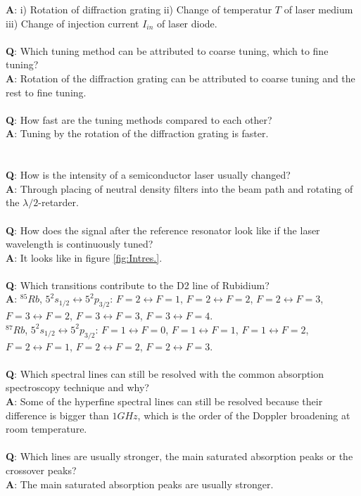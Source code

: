 \textbf{A}: i) Rotation of diffraction grating ii) Change of temperatur $T$ of laser medium iii) Change of injection current $I_{in}$ of laser diode.\\
\\
\noindent
\textbf{Q}: Which tuning method can be attributed to coarse tuning, which to fine tuning? \\
\textbf{A}: Rotation of the diffraction grating can be attributed to coarse tuning and the rest to fine tuning.\\
\\
\noindent
\textbf{Q}: How fast are the tuning methods compared to each other? \\
\textbf{A}: Tuning by the rotation of the diffraction grating is faster.\\
\\\\
\noindent
\textbf{Q}: How is the intensity of a semiconductor laser usually changed? \\
\textbf{A}: Through placing of neutral density filters into the beam path and rotating of the $\lambda/2$-retarder.\\
\\
\noindent
\textbf{Q}: How does the signal after the reference resonator look like if the laser wavelength is continuously tuned? \\
\textbf{A}: It looks like in figure \ref{fig:Intres.}.\\
\\
\noindent
\textbf{Q}: Which transitions contribute to the D2 line of Rubidium? \\
\textbf{A}: $^{85}Rb$, $5^{2}s_{1/2}\leftrightarrow5^{2}p_{3/2}$: $F=2\leftrightarrow F=1$, $F=2\leftrightarrow F=2$, $F=2\leftrightarrow F=3$, $F=3\leftrightarrow F=2$, $F=3\leftrightarrow F=3$, $F=3\leftrightarrow F=4$.\\
$^{87}Rb$, $5^{2}s_{1/2}\leftrightarrow5^{2}p_{3/2}$: $F=1\leftrightarrow F=0$, $F=1\leftrightarrow F=1$, $F=1\leftrightarrow F=2$, $F=2\leftrightarrow F=1$, $F=2\leftrightarrow F=2$, $F=2\leftrightarrow F=3$.\\
\\
\noindent
\textbf{Q}: Which spectral lines can still be resolved with the common absorption spectroscopy technique and why? \\
\textbf{A}: Some of the hyperfine spectral lines can still be resolved because their difference is bigger than $1 GHz$, which is the order of the Doppler broadening at room temperature.\\
\\
\noindent
\textbf{Q}: Which lines are usually stronger, the main saturated absorption peaks or the crossover peaks? \\
\textbf{A}: The main saturated absorption peaks are usually stronger.

